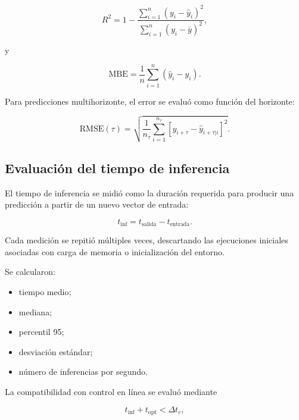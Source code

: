 \begin{equation}
R^2
=
1-
\frac{
\sum_{i=1}^{n}(y_i-\hat{y}_i)^2
}{
\sum_{i=1}^{n}(y_i-\overline{y})^2
},
\end{equation}

y

\begin{equation}
\mathrm{MBE}
=
\frac{1}{n}
\sum_{i=1}^{n}
(\hat{y}_i-y_i).
\end{equation}

Para predicciones multihorizonte, el error se evaluó como función del horizonte:

\begin{equation}
\mathrm{RMSE}(\tau)
=
\sqrt{
\frac{1}{n_{\tau}}
\sum_{i=1}^{n_{\tau}}
\left[
y_{i+\tau}
-
\hat{y}_{i+\tau|i}
\right]^2
}.
\label{eq:rmse_horizonte}
\end{equation}

\subsection{Evaluación del tiempo de inferencia}
\label{subsec:tiempo_inferencia_modelos}

El tiempo de inferencia se midió como la duración requerida para producir una predicción a partir de un nuevo vector de entrada:

\begin{equation}
t_{\mathrm{inf}}
=
t_{\mathrm{salida}}
-
t_{\mathrm{entrada}}.
\end{equation}

Cada medición se repitió múltiples veces, descartando las ejecuciones iniciales asociadas con carga de memoria o inicialización del entorno.

Se calcularon:

\begin{itemize}
    \item tiempo medio;
    \item mediana;
    \item percentil 95;
    \item desviación estándar;
    \item número de inferencias por segundo.
\end{itemize}

La compatibilidad con control en línea se evaluó mediante

\begin{equation}
t_{\mathrm{inf}}
+
t_{\mathrm{opt}}
<
\Delta t_c,
\label{eq:restriccion_tiempo_control}
\end{equation}

